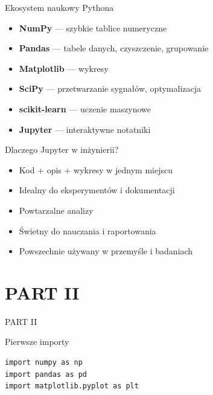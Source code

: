 \documentclass[aspectratio=169]{beamer}
\begin{document}
\begin{frame}{Ekosystem naukowy Pythona}
  \begin{itemize}
    \item \textbf{NumPy} — szybkie tablice numeryczne
    \item \textbf{Pandas} — tabele danych, czyszczenie, grupowanie
    \item \textbf{Matplotlib} — wykresy
    \item \textbf{SciPy} — przetwarzanie sygnałów, optymalizacja
    \item \textbf{scikit-learn} — uczenie maszynowe
    \item \textbf{Jupyter} — interaktywne notatniki
  \end{itemize}
\end{frame}

\begin{frame}{Dlaczego Jupyter w inżynierii?}
  \begin{itemize}
    \item Kod + opis + wykresy w jednym miejscu
    \item Idealny do eksperymentów i dokumentacji
    \item Powtarzalne analizy
    \item Świetny do nauczania i raportowania
    \item Powszechnie używany w przemyśle i badaniach
  \end{itemize}
\end{frame}

\section{PART II}
\begin{frame}[plain]
  \begin{center}
    \vspace{2cm}
    {\color{white}\Huge PART II}
  \end{center}
\end{frame}

\begin{frame}[fragile]{Pierwsze importy}
\begin{verbatim}
import numpy as np
import pandas as pd
import matplotlib.pyplot as plt
\end{verbatim}
\end{frame}
\end{document}
